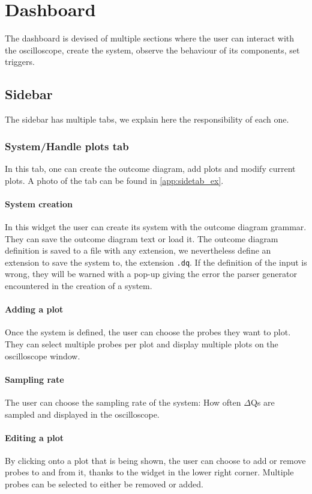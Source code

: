 \section{Dashboard}
    The dashboard is devised of multiple sections where the user can interact with the oscilloscope, create the system, observe the behaviour of its components, set triggers.

    \subsection{Sidebar}
        The sidebar has multiple tabs, we explain here the responsibility of each one.

    \subsubsection{System/Handle plots tab}
        In this tab, one can create the outcome diagram, add plots and modify current plots. A photo of the tab can be found in \cref{app:sidetab_ex}.
    \paragraph{System creation}
        In this widget the user can create its system with the outcome diagram grammar. They can save the outcome diagram text or load it. The outcome diagram definition is saved to a file with any extension, we nevertheless define an extension to save the system to, the extension \texttt{.dq}.
        If the definition of the input is wrong, they will be warned with a pop-up giving the error the parser generator encountered in the creation of a system.

    \paragraph{Adding a plot}
        Once the system is defined, the user can choose the probes they want to plot. They can select multiple probes per plot and display multiple plots on the oscilloscope window.
    
    \paragraph{Sampling rate}
        The user can choose the sampling rate of the system: How often $\Delta$Qs are sampled and displayed in the oscilloscope.

    \paragraph{Editing a plot}
        By clicking onto a plot that is being shown, the user can choose to add or remove probes to and from it, thanks to the widget in the lower right corner. Multiple probes can be selected to either be removed or added.

